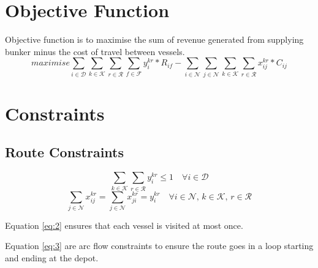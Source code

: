 \section{Objective Function}
Objective function is to maximise the sum of revenue generated from supplying bunker minus the cost of travel between vessels. \\
\begin{equation} \label{eq:obj_fn}
maximise \sum_{i \in \mathcal{D}}\sum_{k \in \mathcal{K}}\sum_{r \in \mathcal{R}}\sum_{f \in \mathcal{F}} y_{i}^{kr} *R_{if} - 
\sum_{i \in \mathcal{N}}\sum_{j \in \mathcal{N}}\sum_{k \in \mathcal{K}}\sum_{r \in \mathcal{R}} x_{ij}^{kr} * C_{ij}
\end{equation}


\section{Constraints}

\subsection{Route Constraints}

\begin{equation} \label{eq:2}
\sum_{k \in \mathcal{K}} \sum_{r \in \mathcal{R}} y_{i}^{kr} \leq 1 \quad \forall i \in \mathcal{D}
\end{equation}
\begin{equation} \label{eq:3}
\sum_{j \in \mathcal{N}} x_{ij}^{kr} = \sum_{j \in \mathcal{N}} x_{ji}^{kr} = y_{i}^{kr} 
\quad \forall i \in \mathcal{N}, \, k \in \mathcal{K}, \, r \in \mathcal{R}
\end{equation}

Equation \ref{eq:2} ensures that each vessel is visited at most once.

Equation \ref{eq:3} are arc flow constraints to ensure the route goes in a loop starting and ending at the depot.

